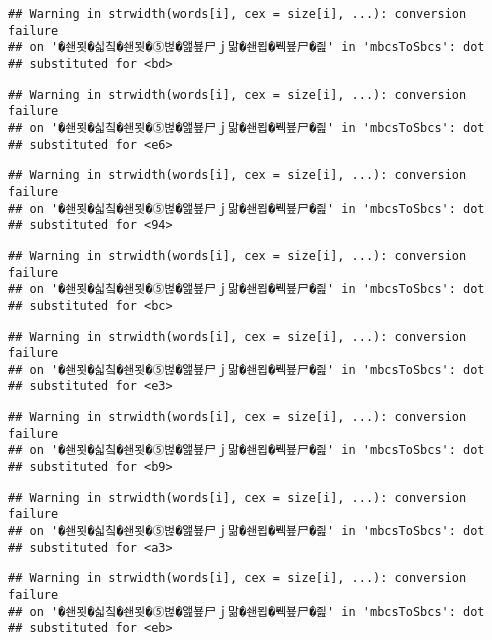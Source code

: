 \documentclass[]{article}
\begin{document}
\begin{verbatim}
## Warning in strwidth(words[i], cex = size[i], ...): conversion failure
## on '�쇈묏�싧칰�쇈묏�⑤벊�앮뵾尸ｊ맒�쇈묍�붹뵾尸�즲' in 'mbcsToSbcs': dot
## substituted for <bd>
\end{verbatim}

\begin{verbatim}
## Warning in strwidth(words[i], cex = size[i], ...): conversion failure
## on '�쇈묏�싧칰�쇈묏�⑤벊�앮뵾尸ｊ맒�쇈묍�붹뵾尸�즲' in 'mbcsToSbcs': dot
## substituted for <e6>
\end{verbatim}

\begin{verbatim}
## Warning in strwidth(words[i], cex = size[i], ...): conversion failure
## on '�쇈묏�싧칰�쇈묏�⑤벊�앮뵾尸ｊ맒�쇈묍�붹뵾尸�즲' in 'mbcsToSbcs': dot
## substituted for <94>
\end{verbatim}

\begin{verbatim}
## Warning in strwidth(words[i], cex = size[i], ...): conversion failure
## on '�쇈묏�싧칰�쇈묏�⑤벊�앮뵾尸ｊ맒�쇈묍�붹뵾尸�즲' in 'mbcsToSbcs': dot
## substituted for <bc>
\end{verbatim}

\begin{verbatim}
## Warning in strwidth(words[i], cex = size[i], ...): conversion failure
## on '�쇈묏�싧칰�쇈묏�⑤벊�앮뵾尸ｊ맒�쇈묍�붹뵾尸�즲' in 'mbcsToSbcs': dot
## substituted for <e3>
\end{verbatim}

\begin{verbatim}
## Warning in strwidth(words[i], cex = size[i], ...): conversion failure
## on '�쇈묏�싧칰�쇈묏�⑤벊�앮뵾尸ｊ맒�쇈묍�붹뵾尸�즲' in 'mbcsToSbcs': dot
## substituted for <b9>
\end{verbatim}

\begin{verbatim}
## Warning in strwidth(words[i], cex = size[i], ...): conversion failure
## on '�쇈묏�싧칰�쇈묏�⑤벊�앮뵾尸ｊ맒�쇈묍�붹뵾尸�즲' in 'mbcsToSbcs': dot
## substituted for <a3>
\end{verbatim}

\begin{verbatim}
## Warning in strwidth(words[i], cex = size[i], ...): conversion failure
## on '�쇈묏�싧칰�쇈묏�⑤벊�앮뵾尸ｊ맒�쇈묍�붹뵾尸�즲' in 'mbcsToSbcs': dot
## substituted for <eb>
\end{verbatim}
\end{document}
